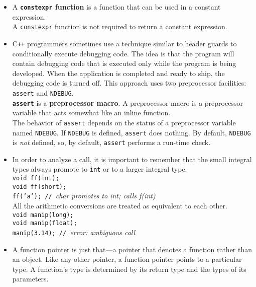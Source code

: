 \begin{itemize}
\item
A \textbf{\texttt{constexpr} function} is a function that can be used in a constant expression.\\
A \texttt{constexpr} function is not required to return a constant expression.

\item
C\texttt{++} programmers sometimes use a technique similar to header guards to conditionally execute debugging code. The idea is that the program will contain debugging code that is executed only while the program is being developed. When the application is completed and ready to ship, the debugging code is turned off. This approach uses two preprocessor facilities: \texttt{assert} and \texttt{NDEBUG}.\\
\textbf{\texttt{assert}} is a \textbf{preprocessor macro}. A preprocessor macro is a preprocessor variable that acts somewhat like an inline function.\\
The behavior of \texttt{assert} depends on the status of a preprocessor variable named \texttt{NDEBUG}. If \texttt{NDEBUG} is defined, \texttt{assert} does nothing. By default, \texttt{NDEBUG} is \textit{not} defined, so, by default, \texttt{assert} performs a run-time check.

\item
In order to analyze a call, it is important to remember that the small integral types always promote to \texttt{int} or to a larger integral type.\\
\hspace*{1em}\texttt{void ff(int);}\\
\hspace*{1em}\texttt{void ff(short);}\\
\hspace*{1em}\texttt{ff('a'); // }\textit{char promotes to int; calls f(int)}\\
All the arithmetic conversions are treated as equivalent to each other.\\
\hspace*{1em}\texttt{void manip(long);}\\
\hspace*{1em}\texttt{void manip(float);}\\
\hspace*{1em}\texttt{manip(3.14); // }\textit{error: ambiguous call}

\item
A function pointer is just that---a pointer that denotes a function rather than an object. Like any other pointer, a function pointer points to a particular type. A function's type is determined by its return type and the types of its parameters.

\end{itemize}